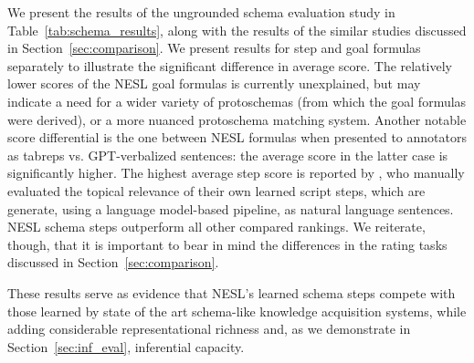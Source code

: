 We present the results of the ungrounded schema evaluation study in Table~\ref{tab:schema_results}, along with the results of the similar studies discussed in Section~\ref{sec:comparison}. We present results for step and goal formulas separately to illustrate the significant difference in average score. The relatively lower scores of the NESL goal formulas is currently unexplained, but may indicate a need for a wider variety of protoschemas (from which the goal formulas were derived), or a more nuanced protoschema matching system. Another notable score differential is the one between NESL formulas when presented to annotators as tabreps vs. GPT-verbalized sentences: the average score in the latter case is significantly higher. The highest average step score is reported by \citet{starsem-scripts}, who manually evaluated the topical relevance of their own learned script steps, which are generate, using a language model-based pipeline, as natural language sentences. NESL schema steps outperform all other compared rankings. We reiterate, though, that it is important to bear in mind the differences in the rating tasks discussed in Section~\ref{sec:comparison}.

These results serve as evidence that NESL's learned schema steps compete with those learned by state of the art schema-like knowledge acquisition systems, while adding considerable representational richness and, as we demonstrate in Section~\ref{sec:inf_eval}, inferential capacity.

